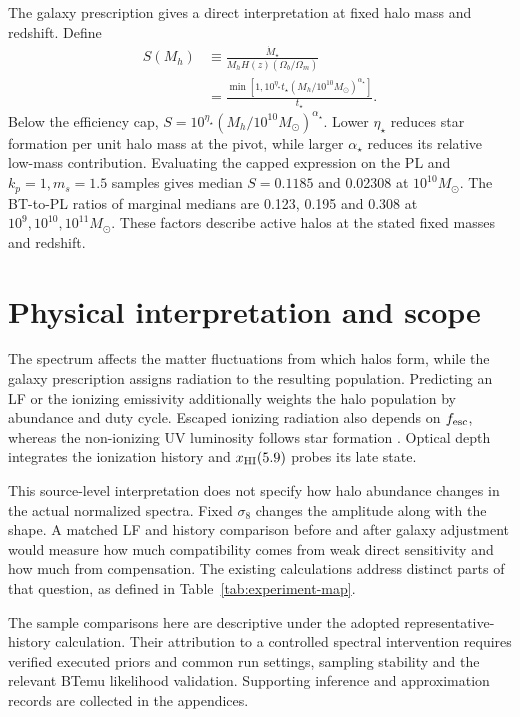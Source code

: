 The galaxy prescription gives a direct interpretation at fixed halo mass and redshift. Define
\begin{align}
S(M_h)&\equiv\frac{\dot M_\star}{M_hH(z)(\Omega_b/\Omega_m)}\nonumber\\
&=\frac{\min\!\left[1,10^{\eta_\star}t_\star(M_h/10^{10}M_\odot)^{\alpha_\star}\right]}{t_\star}.
\label{eq:physics-sfr-factor}
\end{align}
Below the efficiency cap, $S=10^{\eta_\star}(M_h/10^{10}M_\odot)^{\alpha_\star}$. Lower $\eta_\star$ reduces star formation per unit halo mass at the pivot, while larger $\alpha_\star$ reduces its relative low-mass contribution. Evaluating the capped expression on the PL and $k_p=1,m_s=1.5$ samples gives median $S=0.1185$ and 0.02308 at $10^{10}M_\odot$. The BT-to-PL ratios of marginal medians are 0.123, 0.195 and 0.308 at $10^9,10^{10},10^{11}M_\odot$. These factors describe active halos at the stated fixed masses and redshift.

\FloatBarrier
\section{Physical interpretation and scope}\label{initial-condition-scatter-and-limits-of-inference}

The spectrum affects the matter fluctuations from which halos form, while the galaxy prescription assigns radiation to the resulting population. Predicting an LF or the ionizing emissivity additionally weights the halo population by abundance and duty cycle. Escaped ionizing radiation also depends on $f_{\rm esc}$, whereas the non-ionizing UV luminosity follows star formation \cite{Park2019}. Optical depth integrates the ionization history and $x_{\rm HI}(5.9)$ probes its late state.

This source-level interpretation does not specify how halo abundance changes in the actual normalized spectra. Fixed $\sigma_8$ changes the amplitude along with the shape. A matched LF and history comparison before and after galaxy adjustment would measure how much compatibility comes from weak direct sensitivity and how much from compensation. The existing calculations address distinct parts of that question, as defined in Table~\ref{tab:experiment-map}.

The sample comparisons here are descriptive under the adopted representative-history calculation. Their attribution to a controlled spectral intervention requires verified executed priors and common run settings, sampling stability and the relevant BTemu likelihood validation. Supporting inference and approximation records are collected in the appendices.

